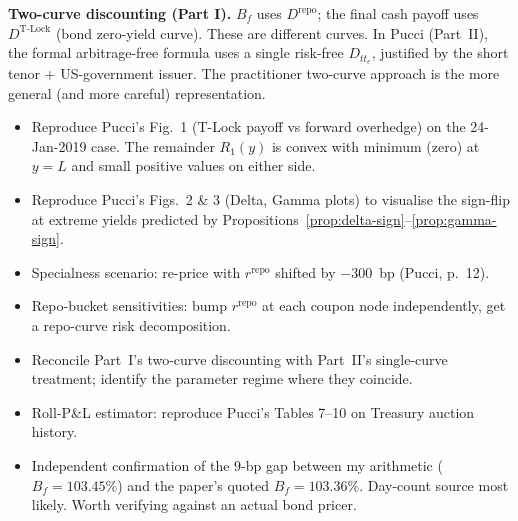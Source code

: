 \documentclass[11pt,a4paper]{article}
\newcommand{\Tlock}{\text{T-Lock}}
\newcommand{\Drepo}{D^{\mathrm{repo}}}
\newcommand{\Dtl}{D^{\Tlock}}
\newcommand{\Bf}{B_f}
\newcommand{\rrepo}{r^{\mathrm{repo}}}
\begin{document}
\begin{validation}
\textbf{Two-curve discounting (Part I).} $\Bf$ uses $\Drepo$; the
final cash payoff uses $\Dtl$ (bond zero-yield curve). These are
different curves. In Pucci (Part~II), the formal arbitrage-free
formula uses a single risk-free $D_{tt_e}$, justified by the short
tenor + US-government issuer. The practitioner two-curve approach
is the more general (and more careful) representation.
\end{validation}

\begin{todobox}
\begin{itemize}[noitemsep]
\item Reproduce Pucci's Fig.~1 (T-Lock payoff vs forward overhedge) on
      the 24-Jan-2019 case. The remainder $R_1(y)$ is convex with
      minimum (zero) at $y=L$ and small positive values on either
      side.
\item Reproduce Pucci's Figs.~2 \& 3 (Delta, Gamma plots) to visualise
      the sign-flip at extreme yields predicted by
      Propositions~\ref{prop:delta-sign}--\ref{prop:gamma-sign}.
\item Specialness scenario: re-price with $\rrepo$ shifted by
      $-300$~bp (Pucci, p.~12).
\item Repo-bucket sensitivities: bump $\rrepo$ at each coupon node
      independently, get a repo-curve risk decomposition.
\item Reconcile Part~I's two-curve discounting with Part~II's
      single-curve treatment; identify the parameter regime where
      they coincide.
\item Roll-P\&L estimator: reproduce Pucci's Tables 7--10 on
      Treasury auction history.
\item Independent confirmation of the $9$-bp gap between my
      arithmetic ($\Bf = 103.45\%$) and the paper's quoted
      $\Bf = 103.36\%$. Day-count source most likely. Worth verifying
      against an actual bond pricer.
\end{itemize}
\end{todobox}
\end{document}
